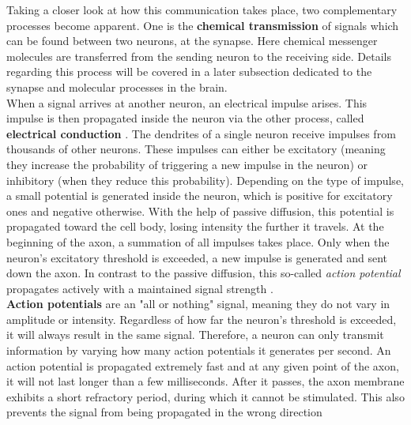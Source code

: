         Taking a closer look at how this communication takes place, two complementary processes become apparent. One is the \textbf{chemical transmission} of signals which can be found between two neurons, at the synapse. Here chemical messenger molecules are transferred from the sending neuron to the receiving side. Details regarding this process will be covered in a later subsection dedicated to the synapse and molecular processes in the brain. \\
        When a signal arrives at another neuron, an electrical impulse arises. This impulse is then propagated inside the neuron via the other process, called \textbf{electrical conduction} \cite{thebrain-SimpleToComplex-cellularFunction-b}.
        The dendrites of a single neuron receive impulses from thousands of other neurons. These impulses can either be excitatory (meaning they increase the probability of triggering a new impulse in the neuron) or inhibitory (when they reduce this probability). Depending on the type of impulse, a small potential is generated inside the neuron, which is positive for excitatory ones and negative otherwise. With the help of passive diffusion, this potential is propagated toward the cell body, losing intensity the further it travels. At the beginning of the axon, a summation of all impulses takes place. Only when the neuron's excitatory threshold is exceeded, a new impulse is generated and sent down the axon. In contrast to the passive diffusion, this so-called \textit{action potential} propagates actively with a maintained signal strength \cite{thebrain-SimpleToComplex-cellularFunction-i}. \\
        \textbf{Action potentials} are an "all or nothing" signal, meaning they do not vary in amplitude or intensity. Regardless of how far the neuron's threshold is exceeded, it will always result in the same signal. Therefore, a neuron can only transmit information by varying how many action potentials it generates per second. An action potential is propagated extremely fast and at any given point of the axon, it will not last longer than a few milliseconds. After it passes, the axon membrane exhibits a short refractory period, during which it cannot be stimulated. This also prevents the signal from being propagated in the wrong direction \cite{thebrain-SimpleToComplex-cellularFunction-a}

        
